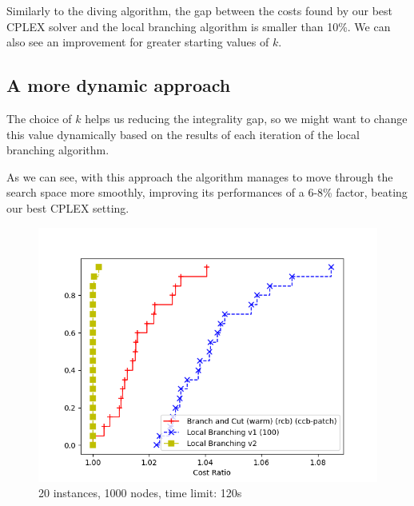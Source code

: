 Similarly to the diving algorithm, the gap between the costs found by our best CPLEX solver and the local branching algorithm is smaller than 10\%. We can also see an improvement for greater starting values of $k$.

\subsection{A more dynamic approach}
The choice of $k$ helps us reducing the integrality gap, so we might want to change this value dynamically based on the results of each iteration of the local branching algorithm.

As we can see, with this approach the algorithm manages to move through the search space more smoothly, improving its performances of a 6-8\% factor, beating our best CPLEX setting.

\begin{figure}[h]
    \centering
    \includegraphics*[width=.6\textwidth]{../plots/perfprof_lb_costs.png}
    \caption*{20 instances, 1000 nodes, time limit: 120s}
\end{figure}

